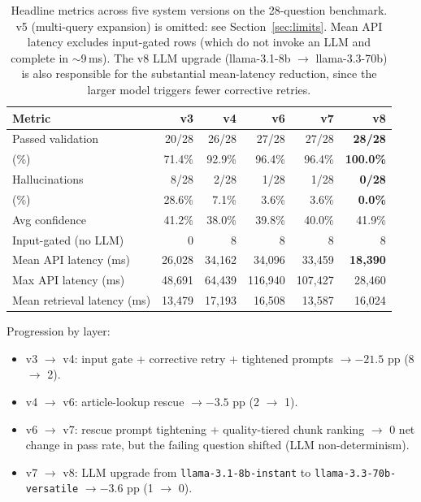 \documentclass[final,1p,times]{elsarticle}
\newcommand{\thead}[1]{\textbf{#1}}                 %
\begin{document}
\begin{table}[!htb]
\centering
\small
\caption{Headline metrics across five system versions on the 28-question
benchmark. v5 (multi-query expansion) is omitted: see
Section~\ref{sec:limits}. Mean API latency excludes input-gated rows (which
do not invoke an LLM and complete in $\sim$9\,ms). The v8 LLM upgrade
(llama-3.1-8b $\rightarrow$ llama-3.3-70b) is also responsible for the
substantial mean-latency reduction, since the larger model triggers fewer
corrective retries.}
\label{tab:results}
\setlength{\tabcolsep}{4pt}
\renewcommand{\arraystretch}{1.15}
\begin{tabular}{lrrrrr}
\toprule
\rowcolor{tabhead}
\thead{Metric}               & \thead{v3} & \thead{v4} & \thead{v6} & \thead{v7} & \thead{v8} \\
\midrule
Passed validation            &  20/28 &  26/28 &  27/28 &  27/28 & \textbf{28/28} \\
\quad (\%)                   & 71.4\% & 92.9\% & 96.4\% & 96.4\% & \textbf{100.0\%} \\
Hallucinations               &   8/28 &   2/28 &   1/28 &   1/28 & \textbf{0/28}  \\
\quad (\%)                   & 28.6\% &  7.1\% &  3.6\% &  3.6\% & \textbf{0.0\%} \\
Avg confidence               & 41.2\% & 38.0\% & 39.8\% & 40.0\% & 41.9\% \\
Input-gated (no LLM)         &      0 &      8 &      8 &      8 &      8 \\
\midrule
Mean API latency (ms)        & 26{,}028 & 34{,}162 & 34{,}096 & 33{,}459 & \textbf{18{,}390} \\
Max API latency (ms)         & 48{,}691 & 64{,}439 & 116{,}940 & 107{,}427 & 28{,}460 \\
Mean retrieval latency (ms)  & 13{,}479 & 17{,}193 & 16{,}508 & 13{,}587 & 16{,}024 \\
\bottomrule
\end{tabular}
\end{table}

Progression by layer:
\begin{itemize}
  \item v3 $\rightarrow$ v4: input gate + corrective retry + tightened
        prompts $\rightarrow -21.5$ pp (8 $\rightarrow$ 2).
  \item v4 $\rightarrow$ v6: article-lookup rescue $\rightarrow -3.5$ pp
        (2 $\rightarrow$ 1).
  \item v6 $\rightarrow$ v7: rescue prompt tightening + quality-tiered chunk
        ranking $\rightarrow$ 0 net change in pass rate, but the failing
        question shifted (LLM non-determinism).
  \item v7 $\rightarrow$ v8: LLM upgrade from
        \texttt{llama-3.1-8b-instant} to \texttt{llama-3.3-70b-versatile}
        $\rightarrow -3.6$ pp (1 $\rightarrow$ 0).
\end{itemize}
\end{document}
